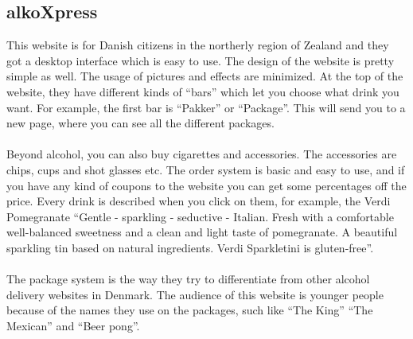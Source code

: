 \documentclass[12p]{article}
\begin{document}
\subsection{alkoXpress \cite{alkoXpress}}
This website is for Danish citizens in the northerly region of Zealand and they got a desktop interface which is easy to use. The design of the website is pretty simple as well. The usage of pictures and effects are minimized. At the top of the website, they have different kinds of “bars” which let you choose what drink you want. For example, the first bar is “Pakker” or “Package”. This will send you to a new page, where you can see all the different packages. 
\\ \\
Beyond alcohol, you can also buy cigarettes and accessories. The accessories are chips, cups and shot glasses etc. The order system is basic and easy to use, and if you have any kind of coupons to the website you can get some percentages off the price. 
Every drink is described when you click on them, for example, the Verdi Pomegranate 
“Gentle - sparkling - seductive - Italian.
Fresh with a comfortable well-balanced sweetness and a clean and light taste of pomegranate.
A beautiful sparkling tin based on natural ingredients.
Verdi Sparkletini is gluten-free”.
\\ \\
The package system is the way they try to differentiate from other alcohol delivery websites in Denmark. The audience of this website is younger people because of the names they use on the packages, such like “The King” “The Mexican” and “Beer pong”. 
\end{document}
